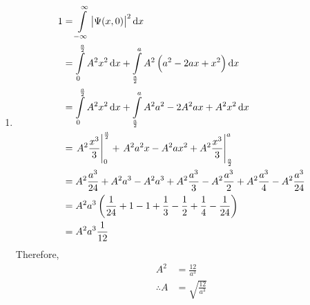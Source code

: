 \documentclass[fleqn, a4paper, 11pt, oneside]{amsart}
\theoremstyle{definition}
\theoremstyle{theorem}
\begin{document}
\begin{solution}
	\begin{enumerate}[leftmargin=*]
		\item
			\begin{align*}
				1 & = \int\limits_{-\infty}^{\infty} \left| \Psi(x,0) \right|^2 \dif x                                                                \\
                                  & = \int\limits_{0}^{\frac{a}{2}} A^2 x^2 \dif x + \int\limits_{\frac{a}{2}}^{a} A^2 \left( a^2 - 2 a x + x^2 \right) \dif x        \\
                                  & = \int\limits_{0}^{\frac{a}{2}} A^2 x^2 \dif x + \int\limits_{\frac{a}{2}}^{a} A^2 a^2 - 2 A^2 a x + A^2 x^2 \dif x               \\
                                  & = \left. A^2 \frac{x^3}{3} \right|_{0}^{\frac{a}{2}} + \left. A^2 a^2 x - A^2 a x^2 + A^2 \frac{x^3}{3} \right|_{\frac{a}{2}}^{a} \\
                                  & = A^2 \frac{a^3}{24} + A^2 a^3 - A^2 a^3 + A^2 \frac{a^3}{3} - A^2 \frac{a^3}{2} + A^2 \frac{a^3}{4} - A^2 \frac{a^3}{24}         \\
                                  & = A^2 a^3 \left( \frac{1}{24} + 1 - 1 + \frac{1}{3} - \frac{1}{2} + \frac{1}{4} - \frac{1}{24} \right)                            \\
                                  & = A^2 a^3 \frac{1}{12}
			\end{align*}
			Therefore,
			\begin{align*}
				A^2          & = \frac{12}{a^3} \\
				\therefore A & = \sqrt{\frac{12}{a^3}}
			\end{align*}
			\begin{figure}[H]
				\centering
\end{figure}
\end{enumerate}
\end{solution}
\end{document}
